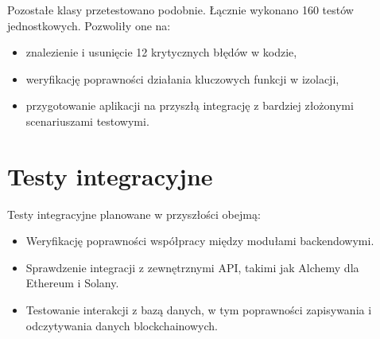 Pozostałe klasy przetestowano podobnie. Łącznie wykonano 160 testów jednostkowych. %
Pozwoliły one na:
\begin{itemize}
    \item znalezienie i usunięcie 12 krytycznych błędów w kodzie,
    \item weryfikację poprawności działania kluczowych funkcji w izolacji,
    \item przygotowanie aplikacji na przyszłą integrację z bardziej złożonymi scenariuszami testowymi.
\end{itemize}

\section{Testy integracyjne}
Testy integracyjne planowane w przyszłości obejmą:
\begin{itemize}
    \item Weryfikację poprawności współpracy między modułami backendowymi.
    \item Sprawdzenie integracji z zewnętrznymi API, takimi jak Alchemy dla Ethereum i Solany.
    \item Testowanie interakcji z bazą danych, w tym poprawności zapisywania i odczytywania danych blockchainowych.
\end{itemize}
